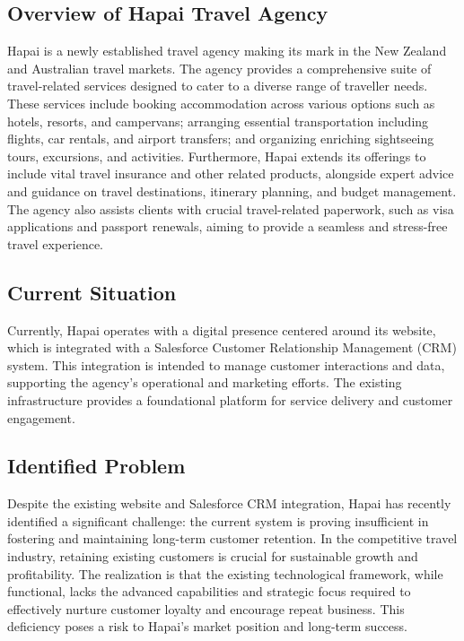 \documentclass{article}
\begin{document}
\subsection{Overview of Hapai Travel Agency}
Hapai is a newly established travel agency making its mark in the New Zealand and Australian travel markets. The agency provides a comprehensive suite of travel-related services designed to cater to a diverse range of traveller needs. These services include booking accommodation across various options such as hotels, resorts, and campervans; arranging essential transportation including flights, car rentals, and airport transfers; and organizing enriching sightseeing tours, excursions, and activities. Furthermore, Hapai extends its offerings to include vital travel insurance and other related products, alongside expert advice and guidance on travel destinations, itinerary planning, and budget management. The agency also assists clients with crucial travel-related paperwork, such as visa applications and passport renewals, aiming to provide a seamless and stress-free travel experience.

\subsection{Current Situation}
Currently, Hapai operates with a digital presence centered around its website, which is integrated with a Salesforce Customer Relationship Management (CRM) system. This integration is intended to manage customer interactions and data, supporting the agency's operational and marketing efforts. The existing infrastructure provides a foundational platform for service delivery and customer engagement.

\subsection{Identified Problem}
Despite the existing website and Salesforce CRM integration, Hapai has recently identified a significant challenge: the current system is proving insufficient in fostering and maintaining long-term customer retention. In the competitive travel industry, retaining existing customers is crucial for sustainable growth and profitability. The realization is that the existing technological framework, while functional, lacks the advanced capabilities and strategic focus required to effectively nurture customer loyalty and encourage repeat business. This deficiency poses a risk to Hapai's market position and long-term success.
\end{document}
